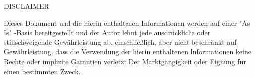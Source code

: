 \begin{center}
    {\Large DISCLAIMER}
\end{center}

Dieses Dokument und die hierin enthaltenen Informationen werden auf einer "As Is" -Basis bereitgestellt und der Autor lehnt jede ausdrückliche oder stillschweigende Gewährleistung ab, einschließlich, aber nicht beschränkt auf Gewährleistung, dass die Verwendung der hierin enthaltenen Informationen keine Rechte oder implizite Garantien verletzt Der Marktgängigkeit oder Eignung für einen bestimmten Zweck.